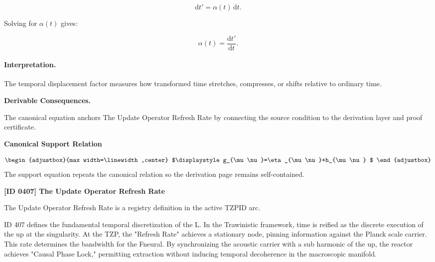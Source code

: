 \begin{equation}
\mathrm{d}t' = \alpha(t)\,\mathrm{d}t .
\end{equation}

Solving for $\alpha(t)$ gives:

\begin{equation}
\boxed{
\alpha(t)=\frac{\mathrm{d}t'}{\mathrm{d}t}.
}
\end{equation}

\paragraph{Interpretation.}
The temporal displacement factor measures how transformed time stretches, compresses, or shifts relative to ordinary time.

\par\vspace{0.35em}
\noindent\textbf{Derivable Consequences.}\quad
\begingroup
\footnotesize
\raggedright
The canonical equation anchors The Update Operator Refresh Rate by connecting the source condition to the derivation layer and proof certificate.
\par\endgroup

\noindent\textbf{Canonical Support Relation}\par
\[
\begin{adjustbox}{max width=\linewidth,center}
$\displaystyle
g_{\mu\nu}=\eta_{\mu\nu}+h_{\mu\nu}
$
\end{adjustbox}
\]
\noindent The support equation repeats the canonical relation so the derivation page remains self-contained.\par

\clearpage
\noindent\textbf{[ID 0407] The Update Operator Refresh Rate}\par
\vspace{0.35em}
\begingroup\small
{}
The Update Operator Refresh Rate is a registry definition in the active TZPID arc.

ID 407 defines the fundamental temporal discretization of the L. In the Trawinistic framework, time is reified as the discrete execution of the up at the singularity. At the TZP, the "Refresh Rate" achieves a stationary node, pinning information against the Planck scale carrier. This rate determines the bandwidth for the Fneural. By synchronizing the acoustic carrier with a sub harmonic of the up, the reactor achieves "Causal Phase Lock," permitting extraction without inducing temporal decoherence in the macroscopic manifold.


